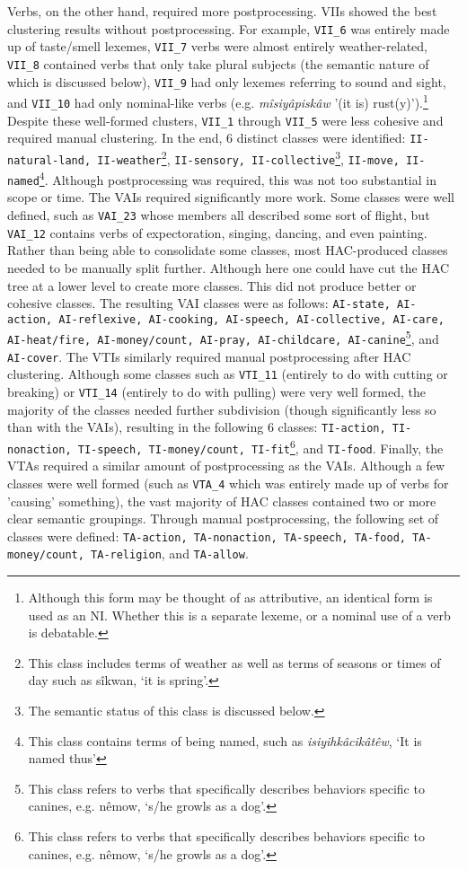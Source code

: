 Verbs, on the other hand, required more postprocessing. VIIs showed the best clustering results without postprocessing. For example, \texttt{VII_6} was entirely made up of taste/smell lexemes, \texttt{VII_7} verbs were almost entirely weather-related, \texttt{VII_8} contained verbs that only take plural subjects (the semantic nature of which is discussed below), \texttt{VII_9} had only lexemes referring to sound and sight, and \texttt{VII_10} had only nominal-like verbs (e.g. \textit{mîsiyâpiskâw} '(it is) rust(y)').\footnote{Although this form may be thought of as attributive, an identical form is used as an NI. Whether this is a separate lexeme, or a nominal use of a verb is debatable.}  Despite these well-formed clusters, \texttt{VII_1} through \texttt{VII_5} were less cohesive and required manual clustering. In the end, 6 distinct classes were identified: \texttt{II-natural-land, II-weather}\footnote{This class includes terms of weather as well as terms of seasons or times of day such as sîkwan, ‘it is spring’.},  \texttt{II-sensory, II-collective}\footnote{The semantic status of this class is discussed below.},  \texttt{II-move, II-named}\footnote{This class contains terms of being named, such as \textit{isiyihkâcikâtêw}, ‘It is named thus’}.  Although postprocessing was required, this was not too substantial in scope or time. The VAIs required significantly more work. Some classes were well defined, such as \texttt{VAI_23} whose members all described some sort of flight, but \texttt{VAI_12} contains verbs of expectoration, singing, dancing, and even painting. Rather than being able to consolidate some classes, most HAC-produced classes needed to be manually split further. Although here one could have cut the HAC tree at a lower level to create more classes. This did not produce better or cohesive classes. The resulting VAI classes were as follows: \texttt{AI-state, AI-action, AI-reflexive, AI-cooking, AI-speech, AI-collective, AI-care, AI-heat/fire, AI-money/count, AI-pray, AI-childcare, AI-canine}\footnote{This class refers to verbs that specifically describes behaviors specific to canines, e.g. nêmow, ‘s/he growls as a dog’.},  and \texttt{AI-cover}. The VTIs similarly required manual postprocessing after HAC clustering. Although some classes such as \texttt{VTI_11} (entirely to do with cutting or breaking) or \texttt{VTI_14} (entirely to do with pulling) were very well formed, the majority of the classes needed further subdivision (though significantly less so than with the VAIs), resulting in the following 6 classes: \texttt{TI-action, TI-nonaction, TI-speech, TI-money/count, TI-fit}\footnote{This class refers to verbs that specifically describes behaviors specific to canines, e.g. nêmow, ‘s/he growls as a dog’.},  and \texttt{TI-food}. Finally, the VTAs required a similar amount of postprocessing as the VAIs. Although a few classes were well formed (such as \texttt{VTA_4} which was entirely made up of verbs for 'causing' something), the vast majority of HAC classes contained two or more clear semantic groupings. Through manual postprocessing, the following set of classes were defined: \texttt{TA-action, TA-nonaction, TA-speech, TA-food, TA-money/count, TA-religion}, and \texttt{TA-allow}. 


